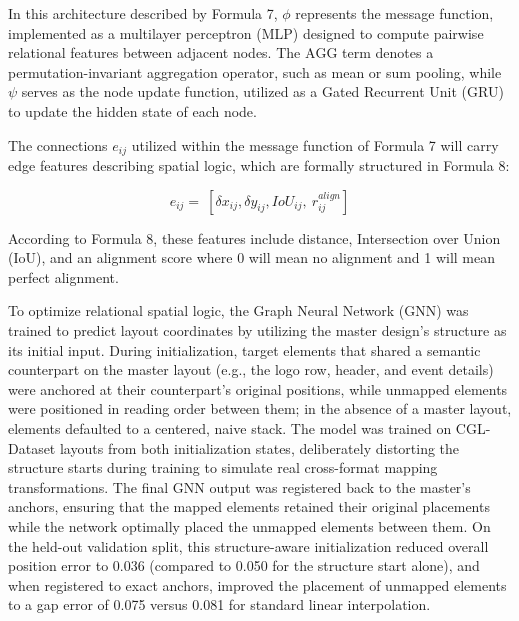 \begin{refsection}
In this architecture described by Formula 7, $\phi$ represents the message function, implemented as a multilayer perceptron (MLP) designed to compute pairwise relational features between adjacent nodes. The $\text{AGG}$ term denotes a permutation-invariant aggregation operator, such as mean or sum pooling, while $\psi$ serves as the node update function, utilized as a Gated Recurrent Unit (GRU) to update the hidden state of each node.

The connections $e_{ij}$ utilized within the message function of Formula 7 will carry edge features describing spatial logic, which are formally structured in Formula 8:
\begin{center}
\begin{minipage}{0.8\textwidth}
\begin{equation}
e_{ij}=\ [{\delta x}_{ij},{\delta y}_{ij},{IoU}_{ij},\ r_{ij}^{align}]
\end{equation}
\centering
\end{minipage}
\end{center}

According to Formula 8, these features include distance, Intersection over Union (IoU), and an alignment score where 0 will mean no alignment and 1 will mean perfect alignment.

To optimize relational spatial logic, the Graph Neural Network (GNN) was trained to predict layout coordinates by utilizing the master design's structure as its initial input. During initialization, target elements that shared a semantic counterpart on the master layout (e.g., the logo row, header, and event details) were anchored at their counterpart's original positions, while unmapped elements were positioned in reading order between them; in the absence of a master layout, elements defaulted to a centered, naive stack. The model was trained on CGL-Dataset layouts from both initialization states, deliberately distorting the structure starts during training to simulate real cross-format mapping transformations. The final GNN output was registered back to the master's anchors, ensuring that the mapped elements retained their original placements while the network optimally placed the unmapped elements between them. On the held-out validation split, this structure-aware initialization reduced overall position error to 0.036 (compared to 0.050 for the structure start alone), and when registered to exact anchors, improved the placement of unmapped elements to a gap error of 0.075 versus 0.081 for standard linear interpolation.


\end{refsection}
